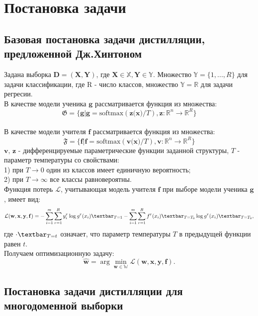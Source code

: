 \newpage

\section{Постановка задачи}

\subsection{Базовая постановка задачи дистилляции, предложенной Дж.Хинтоном}

Задана выборка $\textbf{D}=(\textbf{X},\textbf{Y})$, где $\textbf{X} \in \mathbb{X}, \textbf{Y} \in \mathbb{Y}$. Множество $\mathbb{Y}=\{1,...,R\}$ для задачи классификации, где R - число классов, множество $\mathbb{Y}=\mathbb{R}$ для задачи регресии.\\
В качестве модели ученика $\textbf{g}$ рассматривается функция из множества: $$\mathfrak{G}=\{\textbf{g}|\textbf{g}=\text{softmax}(\textbf{z(x)}/T), \textbf{z}:\mathbb{R}^{n}\rightarrow \mathbb{R}^{R}\}$$\\
В качестве модели учителя $\textbf{f}$ рассматривается функция из множества: $$\mathfrak{F}=\{\textbf{f}|\textbf{f}=\text{softmax}(\textbf{v(x)}/T), \textbf{v}:\mathbb{R}^{n}\rightarrow \mathbb{R}^{R}\}$$
$\textbf{v, z}$ - дифференцируемые параметрические функции заданной структуры, $T$ - параметр температуры со свойствами:\\
1) при $T \rightarrow 0$ один из классов имеет единичную вероятность;\\ 
2) при $T \rightarrow \infty$ все классы равновероятны.\\
Функция потерь $\mathcal{L}$, учитывающая модель учителя $\textbf{f}$ при выборе модели ученика $\textbf{g}$, имеет вид: $$\mathcal{L}(\mathbf{w,x,y,f})=-\sum\limits_{i=1}^{m}\sum\limits_{r=1}^{R}y_{i}^{r}\log{g^{r}(x_{i})}\textbar_{T=1}-\sum\limits_{i=1}^{m}\sum\limits_{r=1}^{R}f^{r}(x_{i})\textbar_{T=T_{0}}\log{g^{r}(x_{i})}\textbar_{T=T_{0}},$$
где $\cdot\textbar_{T=t}$ означает, что параметр температуры $T$ в предыдущей функции равен $t$.\\
Получаем оптимизационную задачу:
$$\hat{\mathbf{w}} = \arg\min_{\mathbf{w} \in \mathbb{W}} \mathcal{L}(\mathbf{w,x,y,f}).$$


\subsection{Постановка задачи дистилляции для многодоменной выборки}


